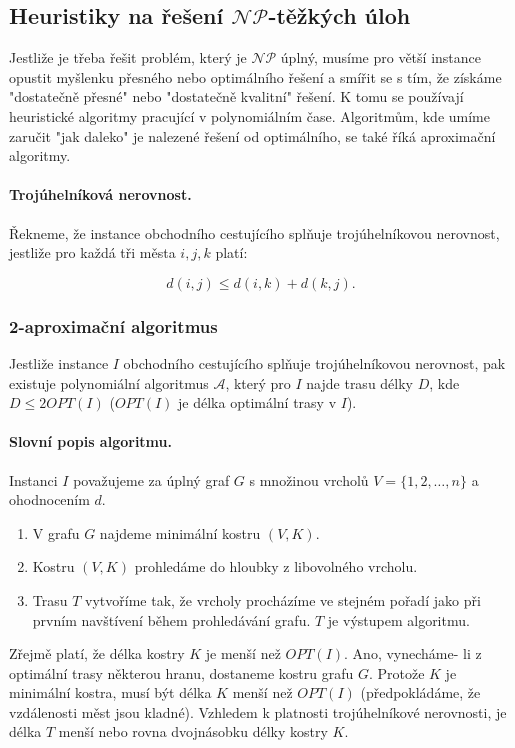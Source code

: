 \subsection*{Heuristiky na řešení $\mathcal{NP}$-těžkých úloh}

Jestliže je třeba řešit problém, který je $\mathcal{NP}$ úplný, musíme pro větší instance opustit myšlenku přesného nebo optimálního řešení a smířit se s tím, že získáme "dostatečně přesné" nebo "dostatečně kvalitní" řešení. K tomu se používají heuristické algoritmy pracující v polynomiálním čase. Algoritmům, kde umíme zaručit "jak daleko" je nalezené řešení od optimálního, se také říká aproximační algoritmy.

\paragraph{Trojúhelníková nerovnost.} Řekneme, že instance obchodního cestujícího splňuje trojúhelníkovou nerovnost, jestliže pro každá tři města $i,j,k$ platí:

$$d(i, j) \leq d(i, k) + d(k, j).$$

\subsubsection*{2-aproximační algoritmus}
Jestliže instance $I$ obchodního cestujícího splňuje trojúhelníkovou nerovnost, pak existuje polynomiální algoritmus $\mathcal{A}$, který pro $I$ najde trasu délky $D$, kde $D \leq 2OPT(I)$ ($OPT(I)$ je délka optimální trasy v $I$).

\paragraph{Slovní popis algoritmu.} Instanci $I$ považujeme za úplný graf $G$ s množinou vrcholů $V = \{1, 2, \hdots , n\}$ a ohodnocením $d$.
\begin{enumerate}[itemsep=0pt]
    \item V grafu $G$ najdeme minimální kostru $(V,K)$.
    \item Kostru $(V,K)$ prohledáme do hloubky z libovolného vrcholu.
    \item Trasu $T$ vytvoříme tak, že vrcholy procházíme ve stejném pořadí jako při prvním navštívení během prohledávání grafu. $T$ je výstupem algoritmu.
\end{enumerate}
Zřejmě platí, že délka kostry $K$ je menší než $OPT(I)$. Ano, vynecháme- li z optimální trasy některou hranu, dostaneme kostru grafu $G$. Protože $K$ je minimální kostra, musí být délka $K$ menší než $OPT(I)$ (předpokládáme, že vzdálenosti měst jsou kladné). Vzhledem k platnosti trojúhelníkové nerovnosti, je délka $T$ menší nebo rovna dvojnásobku délky kostry $K$.

